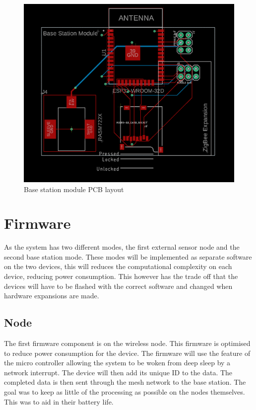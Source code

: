 \documentclass[12pt]{article}
\begin{document}
\begin{figure}[H]
\includegraphics[width=\textwidth]{base-brd}
\caption{Base station module PCB layout}
\label{fig:basebrd}
\end{figure}

\section{Firmware}
As the system has two different modes, the first external sensor node and the second base station
mode. These modes will be implemented as separate software on the two devices, this will reduces
the computational complexity on each device, reducing power consumption. This however has the
trade off that the devices will have to be flashed with the correct software and changed when
hardware expansions are made.

\subsection{Node}
The first firmware component is on the wireless node. This firmware is optimised to reduce power
consumption for the device. The firmware will use the feature of the micro controller allowing the
system to be woken from deep sleep by a network interrupt. The device will then add its unique ID
to the data. The completed data is then sent through the mesh network to the base station. The
goal was to keep as little of the processing as possible on the nodes themselves. This was to aid
in their battery life.
\end{document}
